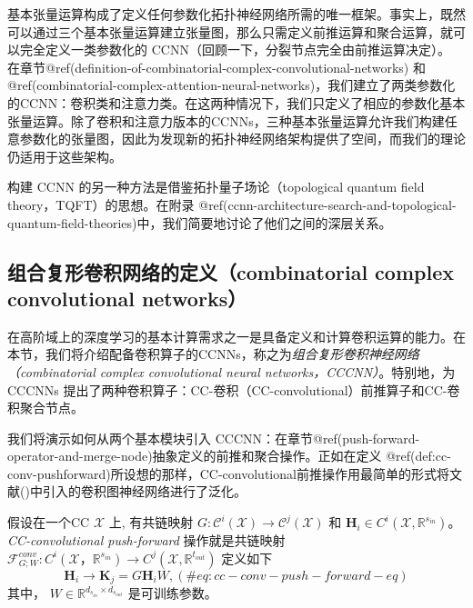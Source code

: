 \documentclass[
  12pt,
]{krantz}
\begin{document}
基本张量运算构成了定义任何参数化拓扑神经网络所需的唯一框架。事实上，既然可以通过三个基本张量运算建立张量图，那么只需定义前推运算和聚合运算，就可以完全定义一类参数化的
CCNN（回顾一下，分裂节点完全由前推运算决定）。
在章节@ref(definition-of-combinatorial-complex-convolutional-networks)
和
@ref(combinatorial-complex-attention-neural-networks)，我们建立了两类参数化的CCNN：卷积类和注意力类。在这两种情况下，我们只定义了相应的参数化基本张量运算。除了卷积和注意力版本的CCNNs，三种基本张量运算允许我们构建任意参数化的张量图，因此为发现新的拓扑神经网络架构提供了空间，而我们的理论仍适用于这些架构。

构建 CCNN 的另一种方法是借鉴拓扑量子场论（topological quantum field
theory，TQFT）的思想。在附录
@ref(ccnn-architecture-search-and-topological-quantum-field-theories)中，我们简要地讨论了他们之间的深层关系。

\subsection{组合复形卷积网络的定义（combinatorial complex convolutional
networks）}\label{definition-of-combinatorial-complex-convolutional-networks}

在高阶域上的深度学习的基本计算需求之一是具备定义和计算卷积运算的能力。在本节，我们将介绍配备卷积算子的CCNNs，称之为\emph{组合复形卷积神经网络（combinatorial
complex convolutional neural networks，CCCNN）}。特别地，为 CCCNNs
提出了两种卷积算子：CC-卷积（CC-convolutional）前推算子和CC-卷积聚合节点。

我们将演示如何从两个基本模块引入
CCCNN：在章节@ref(push-forward-operator-and-merge-node)抽象定义的前推和聚合操作。正如在定义
@ref(def:cc-conv-pushforward)所设想的那样，CC-convolutional前推操作用最简单的形式将文献()中引入的卷积图神经网络进行了泛化。

\label{cc-conv-pushforward}
假设在一个CC \(\mathcal{X}\) 上, 有共链映射
\(G\colon \mathcal{C}^i (\mathcal{X}) \to \mathcal{C}^j(\mathcal{X})\)
和 \(\mathbf{H}_i \in C^i(\mathcal{X}, \mathbb{R}^{{s}_{in}})\)。
\emph{CC-convolutional push-forward} 操作就是共链映射
\(\mathcal{F}^{conv}_{G;W} \colon C^i(\mathcal{X}，\mathbb{R}^{{s}_{in}}) \to C^j(\mathcal{X}, \mathbb{R}^{{t}_{out}})\)
定义如下 \begin{equation}
\mathbf{H}_i \to  \mathbf{K}_j=  G \mathbf{H}_i W ,
(\#eq:cc-conv-push-forward-eq)
\end{equation} 其中，
\(W \in \mathbb{R}^{d_{s_{in}}\times d_{s_{out}}}\) 是可训练参数。
\end{document}
